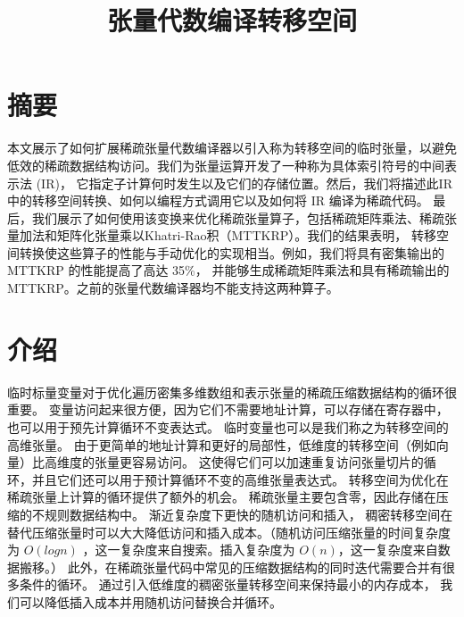 
\begin{translation}
\label{cha:translation}

\title{张量代数编译转移空间\cite{kjolstad:2019:workspaces}}
\maketitle

\tableofcontents

\section{摘要}

本文展示了如何扩展稀疏张量代数编译器以引入称为转移空间的临时张量，以避免低效的稀疏数据结构访问。我们为张量运算开发了一种称为具体索引符号的中间表示法 (IR)，
它指定子计算何时发生以及它们的存储位置。然后，我们将描述此IR中的转移空间转换、如何以编程方式调用它以及如何将 IR 编译为稀疏代码。
最后，我们展示了如何使用该变换来优化稀疏张量算子，包括稀疏矩阵乘法、稀疏张量加法和矩阵化张量乘以Khatri-Rao积（MTTKRP）。我们的结果表明，
转移空间转换使这些算子的性能与手动优化的实现相当。例如，我们将具有密集输出的 MTTKRP 的性能提高了高达 35\%，
并能够生成稀疏矩阵乘法和具有稀疏输出的 MTTKRP。之前的张量代数编译器均不能支持这两种算子。



\section{介绍}

临时标量变量对于优化遍历密集多维数组和表示张量的稀疏压缩数据结构的循环很重要。 变量访问起来很方便，因为它们不需要地址计算，可以存储在寄存器中，
也可以用于预先计算循环不变表达式。 临时变量也可以是我们称之为转移空间的高维张量。 由于更简单的地址计算和更好的局部性，低维度的转移空间（例如向量）比高维度的张量更容易访问。
这使得它们可以加速重复访问张量切片的循环，并且它们还可以用于预计算循环不变的高维张量表达式。
转移空间为优化在稀疏张量上计算的循环提供了额外的机会。 稀疏张量主要包含零，因此存储在压缩的不规则数据结构中。 渐近复杂度下更快的随机访问和插入，
稠密转移空间在替代压缩张量时可以大大降低访问和插入成本。（随机访问压缩张量的时间复杂度为 $O(log n)$ ，这一复杂度来自搜索。插入复杂度为 $O(n)$，这一复杂度来自数据搬移。）
此外，在稀疏张量代码中常见的压缩数据结构的同时迭代需要合并有很多条件的循环。 通过引入低维度的稠密张量转移空间来保持最小的内存成本，
我们可以降低插入成本并用随机访问替换合并循环。


\end{translation}
